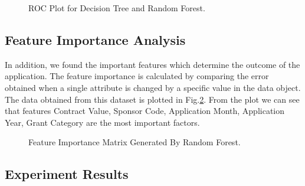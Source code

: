 \documentclass{article} %
\begin{document}
\begin{figure}[h]
\begin{center}
		\end{center}
		
		\caption{ROC Plot for Decision Tree and Random Forest.}
		\label{fig:ROCProbBin}
	\end{figure}
	
	\subsection{Feature Importance Analysis}
	In addition, we found the important features which determine the outcome of the application. The feature importance is calculated by comparing the error obtained when a single attribute is changed by a specific value in the data object. The data obtained from this dataset is plotted in Fig.\ref{fig:FIM}. From the plot we can see that features Contract Value, Sponsor Code, Application Month, Application Year, Grant Category are the most important factors.
	
	\begin{figure}[h]
		\begin{center}
		\end{center}
		\caption{Feature Importance Matrix Generated By Random Forest.}
		\label{fig:FIM}
	\end{figure} 
	
	\subsection{Experiment Results}
	
\end{document}
